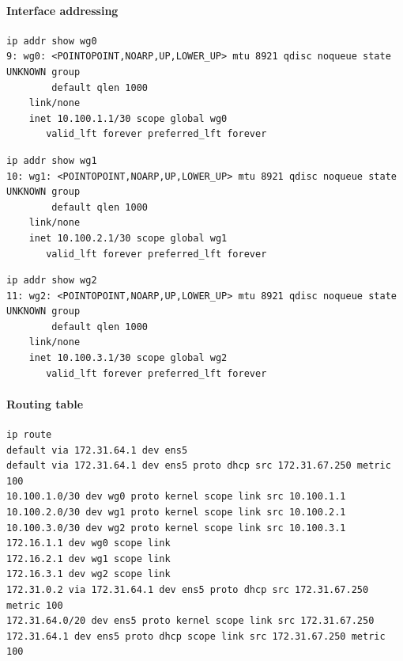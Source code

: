 \documentclass[11pt]{article}
\begin{document}
\paragraph{Interface addressing}

\begin{verbatim}
ip addr show wg0
9: wg0: <POINTOPOINT,NOARP,UP,LOWER_UP> mtu 8921 qdisc noqueue state UNKNOWN group
        default qlen 1000
    link/none
    inet 10.100.1.1/30 scope global wg0
       valid_lft forever preferred_lft forever
\end{verbatim}

\begin{verbatim}
ip addr show wg1
10: wg1: <POINTOPOINT,NOARP,UP,LOWER_UP> mtu 8921 qdisc noqueue state UNKNOWN group
        default qlen 1000
    link/none
    inet 10.100.2.1/30 scope global wg1
       valid_lft forever preferred_lft forever
\end{verbatim}

\begin{verbatim}
ip addr show wg2
11: wg2: <POINTOPOINT,NOARP,UP,LOWER_UP> mtu 8921 qdisc noqueue state UNKNOWN group
        default qlen 1000
    link/none
    inet 10.100.3.1/30 scope global wg2
       valid_lft forever preferred_lft forever
\end{verbatim}

\paragraph{Routing table}

\begin{verbatim}
ip route
default via 172.31.64.1 dev ens5
default via 172.31.64.1 dev ens5 proto dhcp src 172.31.67.250 metric 100
10.100.1.0/30 dev wg0 proto kernel scope link src 10.100.1.1
10.100.2.0/30 dev wg1 proto kernel scope link src 10.100.2.1
10.100.3.0/30 dev wg2 proto kernel scope link src 10.100.3.1
172.16.1.1 dev wg0 scope link
172.16.2.1 dev wg1 scope link
172.16.3.1 dev wg2 scope link
172.31.0.2 via 172.31.64.1 dev ens5 proto dhcp src 172.31.67.250 metric 100
172.31.64.0/20 dev ens5 proto kernel scope link src 172.31.67.250
172.31.64.1 dev ens5 proto dhcp scope link src 172.31.67.250 metric 100
\end{verbatim}

%
%
%
\end{document}
